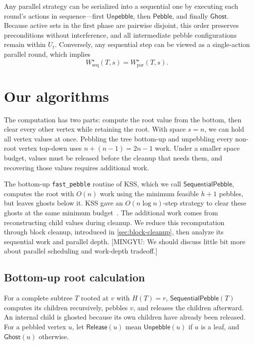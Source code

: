 \documentclass[11pt]{article}
\theoremstyle{definition}
\theoremstyle{remark}
\newcommand{\Peb}{\mathsf{Pebble}}
\newcommand{\Unp}{\mathsf{Unpebble}}
\newcommand{\Ghost}{\mathsf{Ghost}}
\newcommand{\Fast}{\mathsf{SequentialPebble}}
\newcommand{\Release}{\mathsf{Release}}
\newcommand{\Wseq}{W_{\mathrm{seq}}}
\newcommand{\Wpar}{W_{\mathrm{par}}}
\newcommand{\mingyu}[1]{{\color{magenta}\footnotesize [MINGYU: #1]}} %
\begin{document}
Any parallel strategy can be serialized into a sequential one by executing each round's actions in sequence—first $\Unp$, then $\Peb$, and finally $\Ghost$. Because active sets in the first phase are pairwise disjoint, this order preserves preconditions without interference, and all intermediate pebble configurations remain within $U_t$. Conversely, any sequential step can be viewed as a single-action parallel round, which implies
\begin{equation}
    \Wseq^\star(T,s) = \Wpar^\star(T,s).
    \label{eq:serialize}
\end{equation}



\section{Our algorithms}
\label{sec:main-algorithms}

The computation has two parts: compute the root value from the bottom, then clear every other vertex while retaining the root. With space $s=n$, we can hold all vertex values at once. Pebbling the tree bottom-up and unpebbling every non-root vertex top-down uses $n+(n-1)=2n-1$ work. Under a smaller space budget, values must be released before the cleanup that needs them, and recovering those values requires additional work.

The bottom-up \texttt{fast\_pebble} routine of KSS, which we call $\Fast$, computes the root with $O(n)$ work using the minimum feasible $h+1$ pebbles, but leaves ghosts below it. KSS gave an $O(n\log n)$-step strategy to clear these ghosts at the same minimum budget~\cite[Theorem~5.5]{KSS2025}. The additional work comes from reconstructing child values during cleanup. We reduce this recomputation through block cleanup, introduced in \cref{sec:block-cleanup}, then analyze its sequential work and parallel depth. \mingyu{We should discuss little bit more about parallel scheduling and work-depth tradeoff.}

\subsection{Bottom-up root calculation}
\label{sec:fast-root}

For a complete subtree $T$ rooted at $v$ with $H(T)=r$, $\Fast(T)$ computes its children recursively, pebbles $v$, and releases the children afterward. An internal child is ghosted because its own children have already been released. For a pebbled vertex $u$, let $\Release(u)$ mean $\Unp(u)$ if $u$ is a leaf, and $\Ghost(u)$ otherwise.
\end{document}
